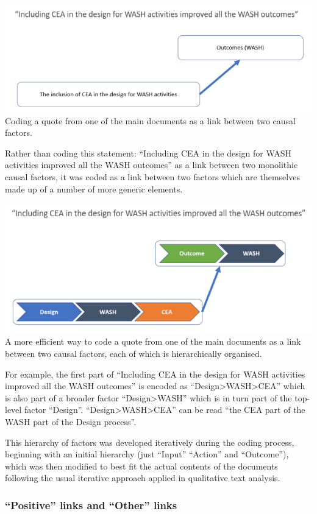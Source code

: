 \documentclass[
]{book}
\begin{document}
\includegraphics{_assets/4a5c0401a54c9651c46474a1f85f8d9e.png}Coding a quote from one of the main documents as a link between two causal factors.

Rather than coding this statement: ``Including CEA in the design for WASH activities
improved all the WASH outcomes'' as a link between two monolithic causal factors, it was
coded as a link between two factors which are themselves made up of a number of more
generic elements.

\includegraphics{_assets/b08c8cb0fc79b3ef6dfe65d3e9a2493a.png}
A more efficient way to code a quote from one of the main documents as a link between
two causal factors, each of which is hierarchically organised.

For example, the first part of ``Including CEA in the design for WASH activities improved all the WASH
outcomes'' is encoded as ``Design\textgreater WASH\textgreater CEA'' which is also part of a broader factor ``Design\textgreater WASH''
which is in turn part of the top-level factor ``Design''. ``Design\textgreater WASH\textgreater CEA'' can be read ``the CEA part of
the WASH part of the Design process''.

This hierarchy of factors was developed iteratively during the coding process, beginning
with an initial hierarchy (just ``Input'' ``Action'' and ``Outcome''), which was then modified
to best fit the actual contents of the documents following the usual iterative approach
applied in qualitative text analysis.

\hypertarget{positive-links-and-other-links}{%
\subsubsection{``Positive'' links and ``Other'' links}\label{positive-links-and-other-links}}
\end{document}
